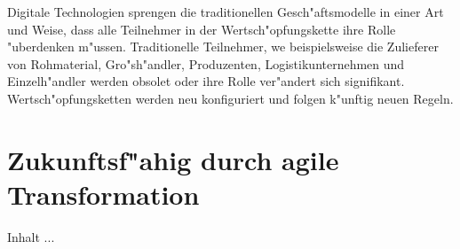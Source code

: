Digitale Technologien sprengen die traditionellen Gesch"aftsmodelle in einer Art und Weise, dass alle Teilnehmer in der Wertsch"opfungskette ihre Rolle "uberdenken m"ussen. Traditionelle Teilnehmer, we beispielsweise die Zulieferer von Rohmaterial, Gro"sh"andler, Produzenten, Logistikunternehmen und Einzelh"andler werden obsolet oder ihre Rolle ver"andert sich signifikant. Wertsch"opfungsketten werden neu konfiguriert und folgen k"unftig neuen Regeln.

\section{Zukunftsf"ahig durch agile Transformation}
Inhalt ...




